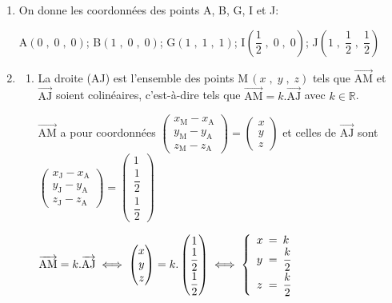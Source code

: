 \documentclass[10pt]{article}
\providecommand{\R}{\mathbb{R}}
\providecommand{\vectt}[1]{\overrightarrow{\mathrm{#1}}}
\begin{document}
\begin{enumerate}
\item On donne les coordonnées des points A, B, G, I et J:

A\;$\left (0 \;,\; 0 \;,\;0 \right )$; B\;$\left (1 \;,\; 0 \;,\; 0 \right )$; G\;$\left ( 1\;,\;  1\;,\;1  \right )$; I\;$\left ( \dfrac{1}{2} \;,\; 0 \;,\; 0 \right )$; J\;$\left ( 1 \;,\; \dfrac{1}{2} \;,\;  \dfrac{1}{2}\right )$
\item
	\begin{enumerate}
		\item 
La droite (AJ) est l'ensemble des points M\,$\left (x\;,\; y \;,\; z\right )$ tels que $\vectt{AM}$ et $\vectt{AJ}$ soient colinéaires, c'est-à-dire tels que $\vectt{AM} = k.\vectt{AJ}$ avec $k\in\R$.

$\vectt{AM}$ a pour coordonnées  
$\begin{pmatrix}
x_{\text{M}} - x_{\text{A}} \\ y_{\text{M}} - y_{\text{A}} \\ z_{\text{M}} - z_{\text{A}}
\end{pmatrix}
=
\begin{pmatrix}
x\\ y \\ z
\end{pmatrix}$
et celles de $\vectt{AJ}$ sont
$\begin{pmatrix}
x_{\text{J}} - x_{\text{A}} \\ y_{\text{J}} - y_{\text{A}} \\ z_{\text{J}} - z_{\text{A}}
\end{pmatrix}
=
\begin{pmatrix}
1\\ \dfrac{1}{2} \\[5pt] \dfrac{1}{2}
\end{pmatrix}$

$\vectt{AM} = k.\vectt{AJ}
\iff
\begin{pmatrix}
x\\ y \\ z
\end{pmatrix}
=
k.\begin{pmatrix}
1\\ \dfrac{1}{2} \\[5pt] \dfrac{1}{2}
\end{pmatrix}
\iff
\left \{
\begin{array}{l !{=} l}
x & k\\
y & \dfrac{k}{2}\\[5pt]
z & \dfrac{k}{2}
\end{array}
\right .$


\end{enumerate}
\end{enumerate}
\end{document}
